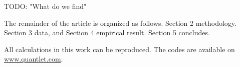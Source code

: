 \documentclass[11pt,a4paper,english]{article}
\begin{document}


TODO: "What do we find" \medskip

The remainder
of the article is organized as follows. Section 2 methodology. Section 3 data, and Section 4 empirical result. Section 5 concludes.\medskip

All calculations in this work can be reproduced.
The codes are available on \href{http://www.quantlet.com/}{www.quantlet.com}.











\newpage
%

\end{document}
